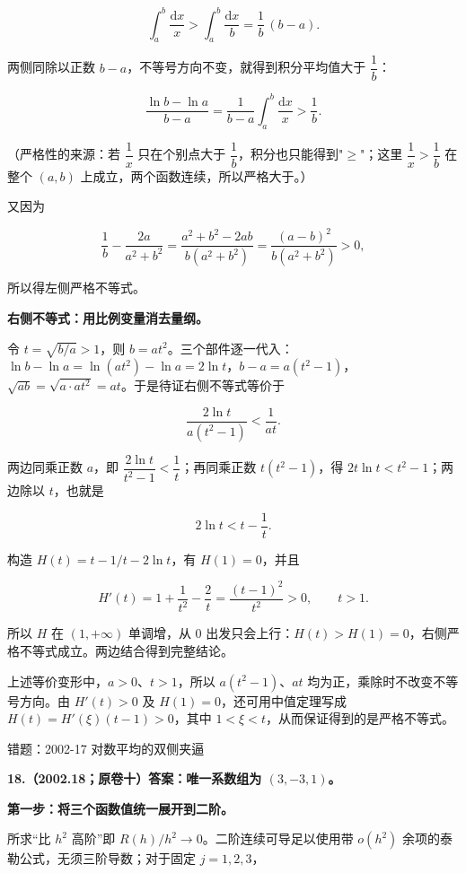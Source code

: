 \documentclass[UTF8,11pt,fontset=windows]{ctexart}
\begin{document}
$$
\int_a^b\frac{\mathrm dx}{x}>\int_a^b\frac{\mathrm dx}{b}=\frac1b\,(b-a).
$$

两侧同除以正数 $b-a$，不等号方向不变，就得到积分平均值大于 $\dfrac1b$：

$$
\frac{\ln b-\ln a}{b-a}
=\frac1{b-a}\int_a^b\frac{\mathrm dx}{x}>\frac1b.
$$

（严格性的来源：若 $\dfrac1x$ 只在个别点大于 $\dfrac1b$，积分也只能得到"$\ge$"；这里 $\dfrac1x>\dfrac1b$ 在整个 $(a,b)$ 上成立，两个函数连续，所以严格大于。）

又因为

$$
\frac1b-\frac{2a}{a^2+b^2}
=\frac{a^2+b^2-2ab}{b(a^2+b^2)}
=\frac{(a-b)^2}{b(a^2+b^2)}>0,
$$

所以得左侧严格不等式。

\textbf{右侧不等式：用比例变量消去量纲。}

令 $t=\sqrt{b/a}>1$，则 $b=at^2$。三个部件逐一代入：$\ln b-\ln a=\ln(at^2)-\ln a=2\ln t$，$b-a=a(t^2-1)$，$\sqrt{ab}=\sqrt{a\cdot at^2}=at$。于是待证右侧不等式等价于

$$
\frac{2\ln t}{a(t^2-1)}<\frac1{at}.
$$

两边同乘正数 $a$，即 $\dfrac{2\ln t}{t^2-1}<\dfrac1t$；再同乘正数 $t(t^2-1)$，得 $2t\ln t<t^2-1$；两边除以 $t$，也就是

$$
2\ln t<t-\frac1t.
$$

构造 $H(t)=t-1/t-2\ln t$，有 $H(1)=0$，并且

$$
H'(t)=1+\frac1{t^2}-\frac2t=\frac{(t-1)^2}{t^2}>0,
\qquad t>1.
$$

所以 $H$ 在 $(1,+\infty)$ 单调增，从 0 出发只会上行：$H(t)>H(1)=0$，右侧严格不等式成立。两边结合得到完整结论。

上述等价变形中，$a>0$、$t>1$，所以 $a(t^2-1)$、$at$ 均为正，乘除时不改变不等号方向。由 $H'(t)>0$ 及 $H(1)=0$，还可用中值定理写成 $H(t)=H'(\xi)(t-1)>0$，其中 $1<\xi<t$，从而保证得到的是严格不等式。

\begingroup\color{gray}错题：2002-17 对数平均的双侧夹逼\par\endgroup

\clearpage

\textbf{18.（2002.18；原卷十）答案：唯一系数组为 $(3,-3,1)$。}

\textbf{第一步：将三个函数值统一展开到二阶。}

所求“比 $h^2$ 高阶”即 $R(h)/h^2\to0$。二阶连续可导足以使用带 $o(h^2)$ 余项的泰勒公式，无须三阶导数；对于固定 $j=1,2,3$，
\end{document}
